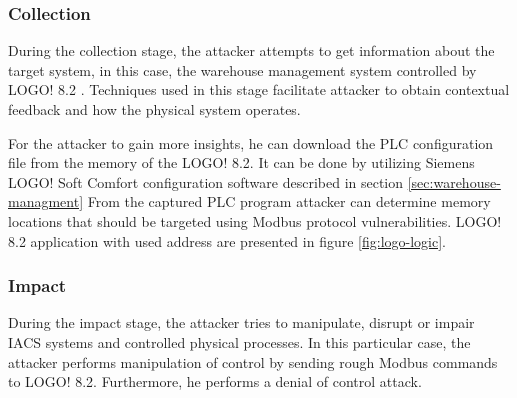 \subsubsection{Collection}

During the collection stage, the attacker attempts to get information about the target system, in this case, the warehouse management system controlled by LOGO! 8.2 . Techniques used in this stage facilitate attacker to obtain contextual feedback and how the physical system operates.

For the attacker to gain more insights, he can download the PLC configuration file from the memory of the LOGO! 8.2. It can be done by utilizing Siemens LOGO! Soft Comfort configuration software described in section \ref{sec:warehouse-managment} From the captured PLC program attacker can determine memory locations that should be targeted using Modbus protocol vulnerabilities. LOGO! 8.2 application with used address are presented in figure \ref{fig:logo-logic}.


\subsubsection{Impact}

During the impact stage, the attacker tries to manipulate, disrupt or impair IACS systems and controlled physical processes. In this particular case, the attacker performs manipulation of control by sending rough Modbus commands to LOGO! 8.2. Furthermore, he performs a denial of control attack.


